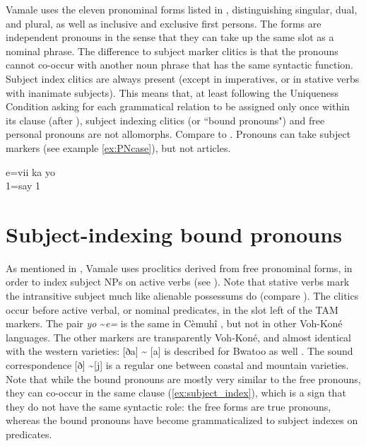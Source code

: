 Vamale uses the eleven pronominal forms listed in , distinguishing singular, dual, and plural, as well as inclusive and exclusive first persons. 
The forms are independent pronouns in the sense that they can take up the same slot as a nominal phrase. The difference to subject marker clitics is that the pronouns cannot co-occur with another noun phrase that has the same syntactic function. Subject index clitics are always present (except in imperatives, or in stative verbs with inanimate subjects). This means that, at least following the Uniqueness Condition asking for each grammatical relation to be assigned only once within its clause (after \cite[19]{kroeger_analyzing_2004}), subject indexing clitics (or ``bound pronouns") and free personal pronouns are not allomorphs. Compare to . Pronouns can take subject markers (see example \ref{ex:PNcase}), but not articles.

\ea \label{ex:PNcase} 
\gll e=vii ka yo\\
 1=say  1\\
\glt {}
%
%
%
%
%
\z


\section{Subject-indexing bound pronouns}
\label{sec:WCSubjProCl}
As mentioned in , Vamale uses proclitics derived from free pronominal forms, in order to index subject NPs on active verbs (see ). Note that stative verbs mark the intransitive subject much like alienable possessums do (compare ). The clitics occur before active verbal, or nominal predicates, in the slot left of the TAM markers. The pair \textit{yo} \textasciitilde \textit{e=}  is the same in Cèmuhî \parencite[61]{rivierre_langue_1980}, but not in other Voh-Koné languages. The other markers are transparently Voh-Koné, and almost identical with the western varieties:  [ða] \textasciitilde {} [a]  is described for Bwatoo as well \parencite[31]{rivierre_bwatoo_2006}. The sound correspondence [ð] \textasciitilde [j] is a regular one between coastal and mountain varieties. Note that while the bound pronouns are mostly very similar to the free pronouns, they can co-occur in the same clause (\ref{ex:subject_index}), which is a sign that they do not have the same syntactic role: the free forms are true pronouns, whereas the bound pronouns have become grammaticalized to subject indexes on predicates.%

